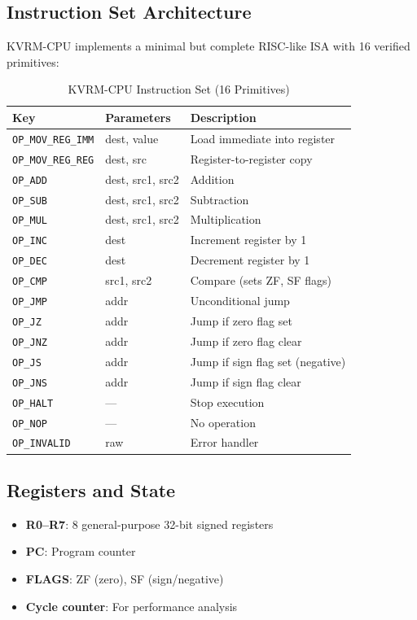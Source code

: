 \documentclass[11pt,a4paper]{article}
\begin{document}
\subsection{Instruction Set Architecture}

KVRM-CPU implements a minimal but complete RISC-like ISA with 16 verified primitives:

\begin{table}[h]
\caption{KVRM-CPU Instruction Set (16 Primitives)}
\centering
\small
\begin{tabular}{@{}lll@{}}
\toprule
Key & Parameters & Description \\
\midrule
\texttt{OP\_MOV\_REG\_IMM} & dest, value & Load immediate into register \\
\texttt{OP\_MOV\_REG\_REG} & dest, src & Register-to-register copy \\
\texttt{OP\_ADD} & dest, src1, src2 & Addition \\
\texttt{OP\_SUB} & dest, src1, src2 & Subtraction \\
\texttt{OP\_MUL} & dest, src1, src2 & Multiplication \\
\texttt{OP\_INC} & dest & Increment register by 1 \\
\texttt{OP\_DEC} & dest & Decrement register by 1 \\
\texttt{OP\_CMP} & src1, src2 & Compare (sets ZF, SF flags) \\
\texttt{OP\_JMP} & addr & Unconditional jump \\
\texttt{OP\_JZ} & addr & Jump if zero flag set \\
\texttt{OP\_JNZ} & addr & Jump if zero flag clear \\
\texttt{OP\_JS} & addr & Jump if sign flag set (negative) \\
\texttt{OP\_JNS} & addr & Jump if sign flag clear \\
\texttt{OP\_HALT} & --- & Stop execution \\
\texttt{OP\_NOP} & --- & No operation \\
\texttt{OP\_INVALID} & raw & Error handler \\
\bottomrule
\end{tabular}
\end{table}

\subsection{Registers and State}

\begin{itemize}
    \item \textbf{R0--R7}: 8 general-purpose 32-bit signed registers
    \item \textbf{PC}: Program counter
    \item \textbf{FLAGS}: ZF (zero), SF (sign/negative)
    \item \textbf{Cycle counter}: For performance analysis
\end{itemize}
\end{document}
